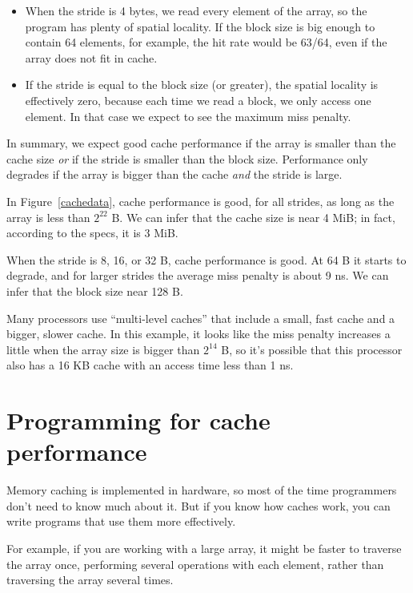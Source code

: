\documentclass[12pt]{book}
\begin{document}
{\begin{itemize}
\item When the stride is 4 bytes, we read every element of the array,
  so the program has plenty of spatial locality.  If the block size is
  big enough to contain 64 elements, for example, the hit rate would
  be 63/64, even if the array does not fit in cache.

\item If the stride is equal to the block size (or greater), the
  spatial locality is effectively zero, because each time we read a
  block, we only access one element.  In that case we expect to see
  the maximum miss penalty.

\end{itemize}

In summary, we expect good cache performance if the array is smaller
than the cache size {\em or} if the stride is smaller than the block
size.  Performance only degrades if the array is bigger than the
cache {\em and} the stride is large.

In Figure~\ref{cachedata}, cache performance is good, for all strides,
as long as the array is less than $2^{22}$ B.  We can infer that the
cache size is near 4 MiB; in fact, according to the specs, it is 3
MiB.

When the stride is 8, 16, or 32 B, cache performance is good.  At 64 B
it starts to degrade, and for larger strides the average miss
penalty is about 9 ns.  We can infer that the block size near 128 B.

Many processors use ``multi-level caches'' that include a small,
fast cache and a bigger, slower cache.  In this example, it looks 
like the miss penalty increases a little when the array size is bigger
than $2^{14}$ B, so it's possible that this processor also has a 16 KB
cache with an access time less than 1 ns.


\section{Programming for cache performance}

Memory caching is implemented in hardware, so most of the time
programmers don't need to know much about it.  But if you know how
caches work, you can write programs that use them more effectively.

For example, if you are working with a large array, it might be
faster to traverse the array once, performing several operations with
each element, rather than traversing the array several times.

}
\end{document}
